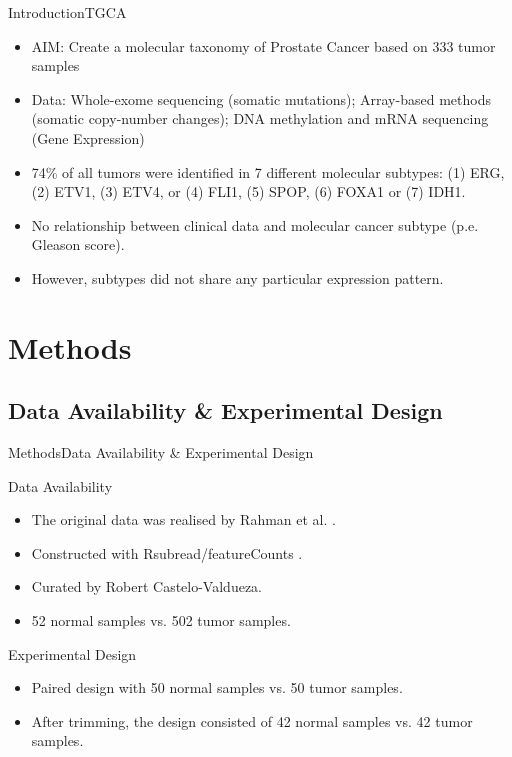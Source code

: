 \documentclass{beamer}
\begin{document}
\begin{frame}{Introduction}{TGCA \cite{Abeshouse2015}}
  \begin{itemize}
  \item<1-> {
    AIM: Create a molecular taxonomy of Prostate Cancer based on 333 tumor samples
    \pause %
  }
  \item<2-> {   
	Data: Whole-exome sequencing (somatic mutations); Array-based methods (somatic copy-number changes); DNA 		methylation and mRNA sequencing (Gene Expression)  
  }
  \item<3-> {
    74\% of all tumors were identified in 7 different molecular subtypes: (1) ERG, (2) ETV1, (3) ETV4, or (4) FLI1, (5) SPOP, (6) FOXA1 or (7) IDH1.
  }
  \item<4-> {
  	No relationship between clinical data and molecular cancer subtype (p.e. Gleason score).
  }
  \item<5->{
  	However, subtypes did not share any particular expression pattern. 
  }
  \end{itemize}
\end{frame}

\section{Methods}

\subsection{Data Availability \& Experimental Design}

\begin{frame}{Methods}{Data Availability \& Experimental Design}
	\begin{block}{Data Availability}
		\begin{itemize}
			\item The original data was realised by Rahman et al. \cite{Rahman15112015} .
			\item Constructed with Rsubread/featureCounts \cite{Rsubread}.
			\item Curated by Robert Castelo-Valdueza.
			\item 52 normal samples vs. 502 tumor samples.
		\end{itemize}
	\end{block}
	
	\begin{block}{Experimental Design}
		\begin{itemize}
			\item Paired design with 50 normal samples vs. 50 tumor samples.
			\item After trimming, the design consisted of 42 normal samples vs. 42 tumor samples.
		\end{itemize}
	\end{block}

\end{frame}
\end{document}
